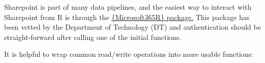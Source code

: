 \documentclass[
  letterpaper,
  DIV=11,
  numbers=noendperiod]{scrreprt}
\newenvironment{Shaded}{\begin{snugshade}}{\end{snugshade}}
\newcommand{\FunctionTok}[1]{\textcolor[rgb]{0.28,0.35,0.67}{#1}}
\newcommand{\NormalTok}[1]{\textcolor[rgb]{0.00,0.23,0.31}{#1}}
\newcommand{\OtherTok}[1]{\textcolor[rgb]{0.00,0.23,0.31}{#1}}
\newcommand{\SpecialCharTok}[1]{\textcolor[rgb]{0.37,0.37,0.37}{#1}}
\newcommand{\StringTok}[1]{\textcolor[rgb]{0.13,0.47,0.30}{#1}}
\begin{document}
Sharepoint is part of many data pipelines, and the easiest way to
interact with Sharepoint from R is through the
\href{https://github.com/Azure/Microsoft365R}{\{Microsoft365R\}
package.} This package has been vetted by the Department of Technology
(DT) and authentication should be straight-forward after calling one of
the initial functions.

\begin{Shaded}
\end{Shaded}

It is helpful to wrap common read/write operations into more usable
functions:
\end{document}
